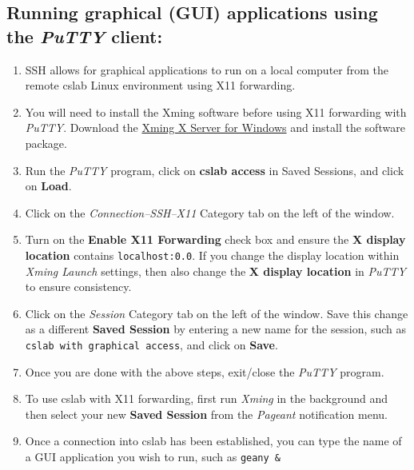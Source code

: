 \documentclass[12pt]{article}
\begin{document}
\begin{flushleft}
\subsection*{Running graphical (GUI) applications using the \textit{PuTTY} client:}
\begin{enumerate}
  \item SSH allows for graphical applications to run on a local computer from the remote cslab Linux environment using X11 forwarding.
  \item You will need to install the Xming software before using X11 forwarding with \textit{PuTTY}. Download the \href{http://sourceforge.net/project/downloading.php?group_id=156984&filename=Xming-6-9-0-31-setup.exe}{Xming X Server for Windows} and install the software package.
  \item Run the \textit{PuTTY} program, click on \textbf{cslab access} in Saved Sessions, and click on \textbf{Load}.
  \item Click on the \textit{Connection--SSH--X11} Category tab on the left of the window.
  \item Turn on the \textbf{Enable X11 Forwarding} check box and ensure the \textbf{X display location} contains \texttt{localhost:0.0}. If you change the display location within \textit{Xming Launch} settings, then also change the \textbf{X display location} in \textit{PuTTY} to ensure consistency.
  \item Click on the \textit{Session} Category tab on the left of the window. Save this change as a different \textbf{Saved Session} by entering a new name for the session, such as \texttt{cslab with graphical access}, and click on \textbf{Save}.
  \item Once you are done with the above steps, exit/close the \textit{PuTTY} program.
  \item To use cslab with X11 forwarding, first run \textit{Xming} in the background and then select your new \textbf{Saved Session} from the \textit{Pageant} notification menu.
  \item Once a connection into cslab has been established, you can type the name of a GUI application you wish to run, such as \verb|geany &|
\end{enumerate} 



\end{flushleft}
\end{document}
